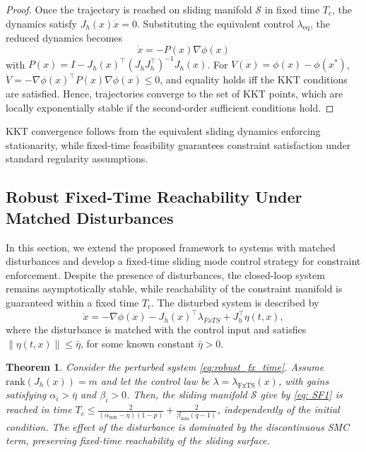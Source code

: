 \documentclass[letterpaper, 10 pt, conference]{ieeeconf}
\newtheorem{theorem}{Theorem}
\begin{document}
\begin{proof}
Once the trajectory is reached on sliding manifold $\mathcal{S}$ in fixed time $T_c$, the
dynamics satisfy $J_h(x)\dot x=0$. Substituting the equivalent control
$\lambda_{\mathrm{eq}}$, the reduced dynamics becomes $$\dot x=-P(x)\nabla \phi(x)$$ with
$P(x)=I-J_h(x)^\top(J_hJ_h^\top)^{-1}J_h(x)$. For $V(x)=\phi(x)-\phi(x^*)$,
$\dot V=-\nabla \phi(x)^\top P(x)\nabla \phi(x)\le0$, and equality holds iff the
KKT conditions are satisfied. Hence, trajectories converge to the set of KKT
points, which are locally exponentially stable if the second-order sufficient
conditions hold.
\end{proof}
KKT convergence follows from the equivalent sliding dynamics enforcing stationarity, while fixed-time feasibility guarantees constraint satisfaction under standard regularity assumptions.
\subsection{Robust Fixed-Time Reachability Under Matched Disturbances}
In this section, we extend the proposed framework to systems with matched disturbances and develop a fixed-time sliding mode control strategy for constraint enforcement. Despite the presence of disturbances, the closed-loop system remains asymptotically stable, while reachability of the constraint manifold is guaranteed within a fixed time $T_c$. The disturbed system is described by
\begin{equation}
\label{eq:robust_fx_time}
\dot{x} = -\nabla \phi(x) - J_h(x)^\top \lambda_{FxTS} + J_h^\top \eta(t,x),
\end{equation}
where the disturbance is matched with the control input and satisfies $\|\eta(t,x)\| \le \bar{\eta}$, for some known constant $\bar{\eta} > 0$.

\begin{theorem}
Consider the perturbed system \eqref{eq:robust_fx_time}. Assume $\mathrm{rank}(J_h(x))=m$ and let the control law be $\lambda = \lambda_{\mathrm{FxTS}}(x)$, with gains satisfying $\alpha_i > \bar{\eta}$ and $\beta_i>0$. Then, the sliding manifold $\mathcal{S}$ give by \eqref{eq: SF1} is reached in time $T_c \le \frac{2}{(\alpha_{\min}-\bar{\eta})(1-p)} + \frac{2}{\beta_{\min}(q-1)}$, independently of the initial condition. The effect of the disturbance is dominated by the discontinuous SMC term, preserving fixed-time reachability of the sliding surface.
\end{theorem}
\end{document}
